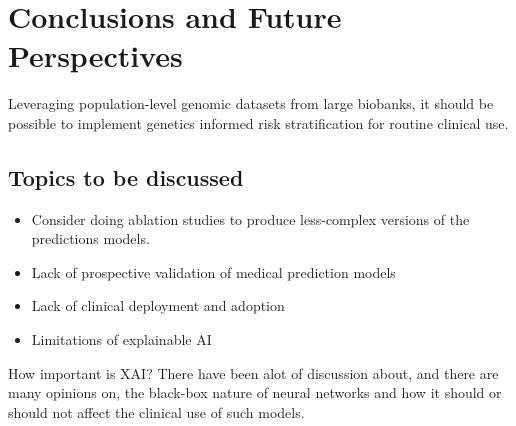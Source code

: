 \chapter{Conclusions and Future Perspectives}
\label{conclusions}



Leveraging population-level genomic datasets from large biobanks,
it should be possible to implement genetics informed risk stratification
for routine clinical use.


\section{Topics to be discussed}
\begin{itemize}
    \item Consider doing ablation studies to produce less-complex versions
        of the predictions models.
    \item Lack of prospective validation of medical prediction models
    \item Lack of clinical deployment and adoption 
    \item Limitations of explainable AI
\end{itemize}


How important is XAI? 
There have been alot of discussion about, and there are many opinions on, 
the black-box nature of neural networks and 
how it should or should not affect the clinical use of such models.
\autocite{gunningXAI2019, vanderveldenExplainable2022}

